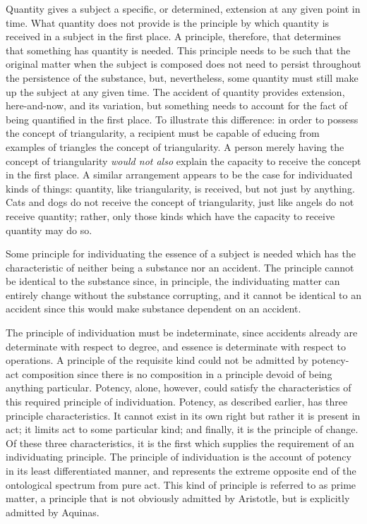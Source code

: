 Quantity gives a subject a specific, or determined, extension at any given point in time. What quantity does not provide is the principle by which quantity is received in a subject in the first place. A principle, therefore, that determines that something has quantity is needed. This principle needs to be such that the original matter when the subject is composed does not need to persist throughout the persistence of the substance, but, nevertheless, some quantity must still make up the subject at any given time. The accident of quantity provides extension, here-and-now, and its variation, but something needs to account for the fact of being quantified in the first place. To illustrate this difference: in order to possess the concept of triangularity, a recipient must be capable of educing from examples of triangles the concept of triangularity. A person merely having the concept of triangularity \emph{would not also} explain the capacity to receive the concept in the first place. A similar arrangement appears to be the case for individuated kinds of things: quantity, like triangularity, is received, but not just by anything. Cats and dogs do not receive the concept of triangularity, just like angels do not receive quantity; rather, only those kinds which have the capacity to receive quantity may do so.


Some principle for individuating the essence of a subject is needed which has the characteristic of neither being a substance nor an accident. The principle cannot be identical to the substance since, in principle, the individuating matter can entirely change without the substance corrupting, and it cannot be identical to an accident since this would make substance dependent on an accident.

The principle of individuation must be indeterminate, since accidents already are determinate with respect to degree, and essence is determinate with respect to operations. A principle of the requisite kind could not be admitted by potency-act composition since there is no composition in a principle devoid of being anything particular.
Potency, alone, however, could satisfy the characteristics of this required principle of individuation.
Potency, as described earlier, has three principle characteristics. It cannot exist in its own right but rather it is present in act; it limits act to some particular kind; and finally, it is the principle of change.
Of these three characteristics, it is the first which supplies the requirement of an individuating principle. The principle of individuation is the account of potency in its least differentiated manner, and represents the extreme opposite end of the ontological spectrum from pure act.
This kind of principle is referred to as prime matter, a principle that is not obviously admitted by Aristotle, but is explicitly admitted by Aquinas.

